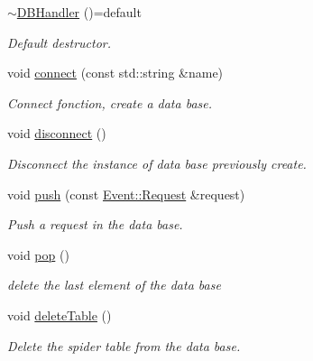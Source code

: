 \begin{DoxyCompactItemize}
\hyperlink{class_spider_1_1_d_b_1_1_d_b_handler_a86700944ee698f784de64c20e5bb6f86}{$\sim$\+D\+B\+Handler} ()=default
\begin{DoxyCompactList}\small\item\em Default destructor. \end{DoxyCompactList}\item 
void \hyperlink{class_spider_1_1_d_b_1_1_d_b_handler_a139355686a0f6eca4b58d26332c9a5c7}{connect} (const std\+::string \&name)
\begin{DoxyCompactList}\small\item\em Connect fonction, create a data base. \end{DoxyCompactList}\item 
\mbox{\label{class_spider_1_1_d_b_1_1_d_b_handler_af3c0ca362f8aa317a199d97d578d2506}} 
void \hyperlink{class_spider_1_1_d_b_1_1_d_b_handler_af3c0ca362f8aa317a199d97d578d2506}{disconnect} ()
\begin{DoxyCompactList}\small\item\em Disconnect the instance of data base previously create. \end{DoxyCompactList}\item 
void \hyperlink{class_spider_1_1_d_b_1_1_d_b_handler_a12968ed2952aa4365d17733227bc4cdb}{push} (const \hyperlink{class_spider_1_1_event_1_1_request}{Event\+::\+Request} \&request)
\begin{DoxyCompactList}\small\item\em Push a request in the data base. \end{DoxyCompactList}\item 
\mbox{\label{class_spider_1_1_d_b_1_1_d_b_handler_a76b1ef1bd0463caded154fd1400445f9}} 
void \hyperlink{class_spider_1_1_d_b_1_1_d_b_handler_a76b1ef1bd0463caded154fd1400445f9}{pop} ()
\begin{DoxyCompactList}\small\item\em delete the last element of the data base \end{DoxyCompactList}\item 
\mbox{\label{class_spider_1_1_d_b_1_1_d_b_handler_ac518baf148ad74676cdcfd3d16d57263}} 
void \hyperlink{class_spider_1_1_d_b_1_1_d_b_handler_ac518baf148ad74676cdcfd3d16d57263}{delete\+Table} ()
\begin{DoxyCompactList}\small\item\em Delete the spider table from the data base. \end{DoxyCompactList}\item 

\end{DoxyCompactItemize}
